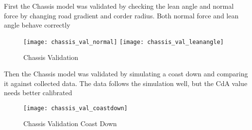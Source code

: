 \documentclass[../SimBALink.tex]{subfiles}
\begin{document}
First the Chassis model was validated by checking the lean angle and normal force by changing road gradient and corder radius. Both normal force and lean angle behave correctly

\begin{figure}[H]
\center
  \texttt{[image: chassis\_val\_normal]}
  \texttt{[image: chassis\_val\_leanangle]}
  \caption{Chassis Validation}
\end{figure}

Then the Chassis model was validated by simulating a coast down and comparing it against collected data. The data follows the simulation well, but the CdA value needs better calibrated

\begin{figure}[H]
\center
 \texttt{[image: chassis\_val\_coastdown]}
  \caption{Chassis Validation Coast Down}
\end{figure}
\end{document}
